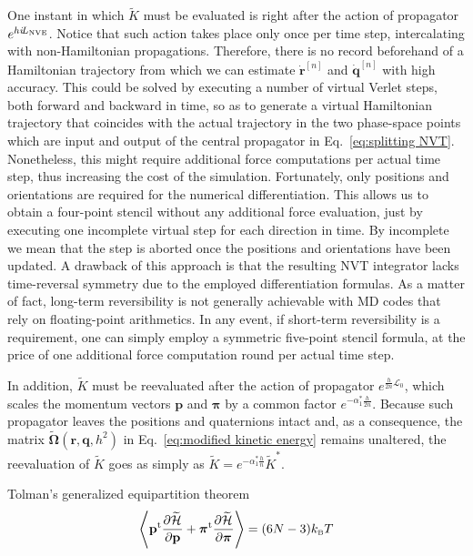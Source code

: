\documentclass[
journal=jctcce,
layout=twocolumn
]{achemso}
\newcommand{\vt}[1]{\boldsymbol{\mathbf{#1}}}   %
\newcommand{\tr}[1]{#1^\text{t}}                %
\newcommand{\diff}[2]{\frac{\partial #1}{\partial #2}} %
\newcommand{\Ham}[1]{{\mathcal H}_\text{#1}}    %
\newcommand{\Liu}[1]{i\!L_\text{#1}}            %
\newcommand{\timestep}{h}
\newcommand{\modified}[1]{\widetilde{#1}}
\begin{document}
One instant in which $\modified K$ must be evaluated is right after the action of propagator $e^{\timestep \Liu{\tiny NVE}}$.
Notice that such action takes place only once per time step, intercalating with non-Hamiltonian propagations.
Therefore, there is no record beforehand of a Hamiltonian trajectory from which we can estimate $\dot{\vt r}^{[n]}$ and $\dot{\vt q}^{[n]}$ with high accuracy.
This could be solved by executing a number of virtual Verlet steps, both forward and backward in time, so as to generate a virtual Hamiltonian trajectory that coincides with the actual trajectory in the two phase-space points which are input and output of the central propagator in Eq.~\eqref{eq:splitting NVT}.
Nonetheless, this might require additional force computations per actual time step, thus increasing the cost of the simulation.
Fortunately, only positions and orientations are required for the numerical differentiation.
This allows us to obtain a four-point stencil without any additional force evaluation, just by executing one incomplete virtual step for each direction in time.
By incomplete we mean that the step is aborted once the positions and orientations have been updated.
A drawback of this approach is that the resulting NVT integrator lacks time-reversal symmetry due to the employed differentiation formulas.
As a matter of fact, long-term reversibility is not generally achievable with MD codes that rely on floating-point arithmetics.
In any event, if short-term reversibility is a requirement, one can simply employ a symmetric five-point stencil formula, at the price of one additional force computation round per actual time step.

In addition, $\modified K$ must be reevaluated after the action of propagator $e^{\frac{\timestep}{2n} {\mathcal L}_0}$, which scales the momentum vectors $\vt p$ and $\vt \pi$ by a common factor $e^{-\alpha_1^\ast \frac{\timestep}{2n}}$.
Because such propagator leaves the positions and quaternions intact and, as a consequence, the matrix $\modified{\mathbf \Omega}(\vt r, \vt q, \timestep^2)$ in Eq.~\eqref{eq:modified kinetic energy} remains unaltered, the reevaluation of $\modified K$ goes as simply as ${\modified K} = e^{-\alpha_1^\ast \frac{\timestep}{n}} {\modified K}^\ast$.

Tolman's generalized equipartition theorem \cite{Uline_2008}
\begin{equation*}
\left\langle \tr{\vt p} \diff{\modified{\Ham{}}}{\vt p} + \tr{\vt \pi} \diff{\modified{\Ham{}}}{\vt \pi} \right\rangle = (6N - 3) k_\text{\tiny B} T
\end{equation*}
\end{document}
